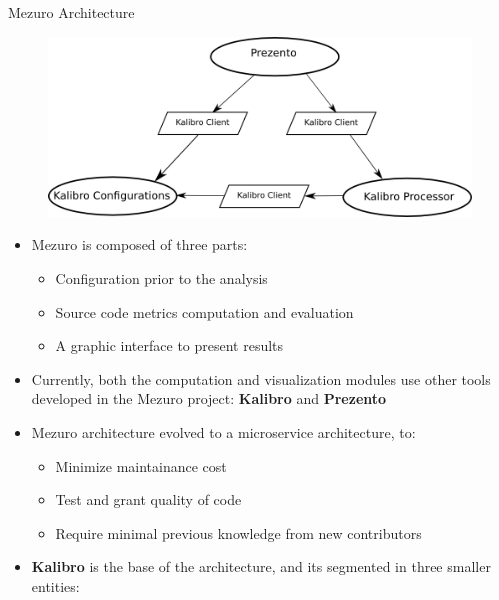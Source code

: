 \begin{block}{Mezuro Architecture}
        \begin{figure}
            \begin{center}
                \includegraphics[scale=1.5]{figures/MezuroArchitecture.png}
                \label{fig:architecture}
            \end{center}
        \end{figure}
    \begin{itemize}
        \item Mezuro is composed of three parts:
            \begin{itemize}
                \item Configuration prior to the analysis
                \item Source code metrics computation and evaluation
                \item A graphic interface to present results
            \end{itemize}
        \item Currently, both the computation and visualization modules use
            other tools developed in the Mezuro project: \textbf{Kalibro} and
            \textbf{Prezento}

        \item Mezuro architecture evolved to a microservice architecture, to:
            \begin{itemize}
                \item Minimize maintainance cost
                \item Test and grant quality of code
                \item Require minimal previous knowledge from new contributors
            \end{itemize}
        \item \textbf{Kalibro} is the base of the architecture, and its
            segmented in three smaller entities:


\end{itemize}
\end{block}
